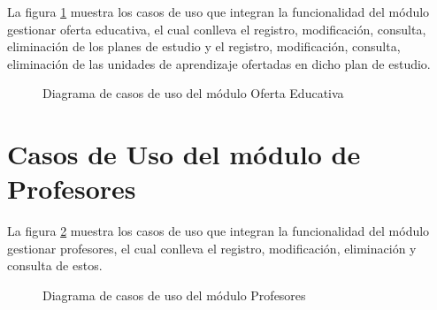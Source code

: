 La figura \ref{fig:casosUso:gestionarOfertaEducativa} muestra los casos de uso que integran la funcionalidad del módulo gestionar oferta educativa, el cual conlleva el registro, modificación, consulta, eliminación de los planes de estudio y el registro, modificación, consulta, eliminación de las unidades de aprendizaje ofertadas en dicho plan de estudio.
\begin{figure}[htpb!]
	\begin{center}
		\caption{Diagrama de casos de uso del módulo Oferta Educativa \label{fig:casosUso:gestionarOfertaEducativa}}
	\end{center}
\end{figure}


\section{Casos de Uso del módulo de Profesores}

La figura \ref{fig:casosUso:gestionarProfesores} muestra los casos de uso que integran la funcionalidad del módulo gestionar profesores, el cual conlleva el registro, modificación, eliminación y consulta de estos.
\begin{figure}[htpb!]
	\begin{center}
		\caption{Diagrama de casos de uso del módulo Profesores \label{fig:casosUso:gestionarProfesores}}
	\end{center}
\end{figure}

